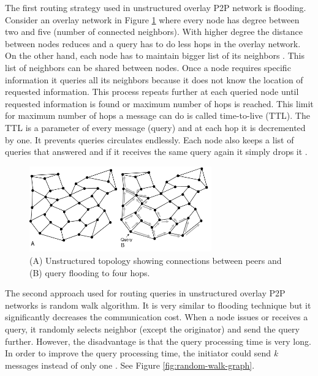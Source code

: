 The first routing strategy used in unstructured overlay P2P network is flooding. Consider an overlay network in Figure \ref{fig:flooding-graph} where every node has degree between two and five (number of connected neighbors). With higher degree the distance between nodes reduces and a query has to do less hops in the overlay network. On the other hand, each node has to maintain bigger list of its neighbors \cite{koegel_buford_p2p_2009}. This list of neighbors can be shared between nodes. Once a node requires specific information it queries all its neighbors because it does not know the location of requested information. This process repeats further at each queried node until requested information is found or maximum number of hops is reached. This limit for maximum number of hops a message can do is called time-to-live (TTL). The TTL is a parameter of every message (query) and at each hop it is decremented by one. It prevents queries circulates endlessly. Each node also keeps a list of queries that answered and if it receives the same query again it simply drops it \cite{taylor_p2p_2009}.

\begin{figure}[ht]
	\centering
	\includegraphics[width=0.7\textwidth]{images/flooding-graph.png}
	\caption{\label{fig:flooding-graph}(A) Unstructured topology showing connections between peers and (B) query flooding to four hops. \cite{koegel_buford_p2p_2009}}
\end{figure}

The second approach used for routing queries in unstructured overlay P2P networks is random walk algorithm. It is very similar to flooding technique but it significantly decreases the communication cost. When a node issues or receives a query, it randomly selects neighbor (except the originator) and send the query further. However, the disadvantage is that the query processing time is very long. In order to improve the query processing time, the initiator could send \textit{k} messages instead of only one \cite{vu_peer--peer_2010}. See Figure \ref{fig:random-walk-graph}.

